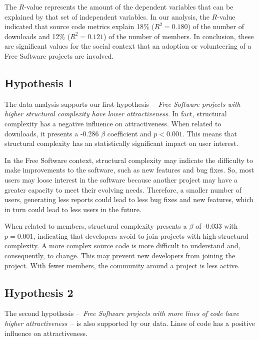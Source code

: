\documentclass[conference]{IEEEtran}
\newcommand{\TODO}[1]{{\color{red}\textbf{\uwave{#1}}}}
\begin{document}
The $R$-value represents the amount of the dependent variables that can be
explained by that set of independent variables.
%
In our analysis, the $R$-value indicated that source code metrics explain 18\%
($R^2 = 0.180$) of the number of downloads and 12\% ($R^2 = 0.121$) of the
number of members. 
%
In conclusion, these are significant values for the social context that an
adoption or volunteering of a Free Software projects are involved.

\subsection{Hypothesis 1}

The data analysis supports our first hypothesis 
--~\emph{Free Software projects with higher structural complexity 
have lower attractiveness}.
%
In fact, structural complexity has a negative influence on attractiveness.
%
When related to downloads, it presents a -0.286 $\beta$ coefficient
and $p < 0.001$.
%
This means that structural complexity has an statistically significant impact on user interest.


In the Free Software context, structural complexity may indicate the
difficulty to make improvements to the software, such as new features and bug
fixes.
%
So, most users may loose interest in the software because another
project may have a greater capacity to meet their evolving needs.
%
Therefore, a smaller number of users, generating less reports could lead to 
less bug fixes and new features, which in turn could lead to less users in the future.


When related to members, structural complexity presents a $\beta$ of
-0.033 with $p = 0.001$, indicating that developers avoid to join
projects with high structural complexity.
%
A more complex source code is more difficult to understand and, consequently, 
to change.
%
This may prevent new developers from joining the project. With fewer members,
the community around a project is less active.

\subsection{Hypothesis 2}

The second hypothesis --~\emph{Free Software projects with more
lines of code have higher attractiveness}~-- is also supported by our data.
Lines of code has a positive influence on attractiveness.
\end{document}
